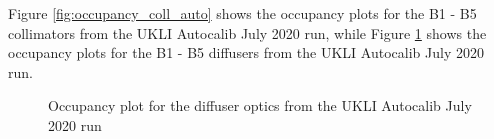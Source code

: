 
Figure \ref{fig:occupancy_coll_auto} shows the occupancy plots for the B1 - B5 collimators from the UKLI Autocalib July 2020 run, while  Figure \ref{fig:occupancy_diff_auto} shows the occupancy plots for the B1 - B5 diffusers from the UKLI Autocalib July 2020 run.


\begin{figure}
    \centering
    
    \caption{Occupancy plot for the diffuser optics from the UKLI Autocalib July 2020 run} \label{fig:occupancy_diff_auto} 
    
     \hfill
     \par
     \hfill

\end{figure}

